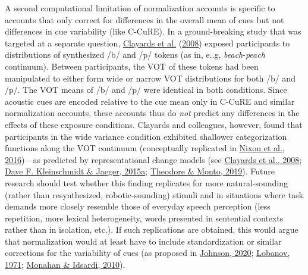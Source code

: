 \documentclass[
  11pt,
  english,
  man,floatsintext]{apa6}
\begin{document}
A second computational limitation of normalization accounts is specific to accounts that only correct for differences in the overall mean of cues but not differences in cue variability (like C-CuRE). In a ground-breaking study that was targeted at a separate question, \protect\hyperlink{ref-clayards2008}{Clayards et al.} (\protect\hyperlink{ref-clayards2008}{2008}) exposed participants to distributions of synthesized /b/ and /p/ tokens (as in, e..g, \emph{beach}-\emph{peach} continuum). Between participants, the VOT of these tokens had been manipulated to either form wide or narrow VOT distributions for both /b/ and /p/. The VOT means of /b/ and /p/ were identical in both conditions. Since acoustic cues are encoded relative to the cue mean only in C-CuRE and similar normalization accounts, these accounts thus do \emph{not} predict any differences in the effects of these exposure conditions. Clayards and colleagues, however, found that participants in the wide variance condition exhibited shallower categorization functions along the VOT continuum (conceptually replicated in \protect\hyperlink{ref-nixon2016}{Nixon et al., 2016})---as predicted by representational change models (see \protect\hyperlink{ref-clayards2008}{Clayards et al., 2008}; \protect\hyperlink{ref-kleinschmidt-jaeger2015}{Dave F. Kleinschmidt \& Jaeger, 2015a}; \protect\hyperlink{ref-theodore-monto2019}{Theodore \& Monto, 2019}). Future research should test whether this finding replicates for more natural-sounding (rather than resynthesized, robotic-sounding) stimuli and in situations where task demands more closely resemble those of everyday speech perception (less repetition, more lexical heterogeneity, words presented in sentential contexts rather than in isolation, etc.). If such replications are obtained, this would argue that normalization would at least have to include standardization or similar corrections for the variability of cues (as proposed in \protect\hyperlink{ref-johnson2020}{Johnson, 2020}; \protect\hyperlink{ref-lobanov1971}{Lobanov, 1971}; \protect\hyperlink{ref-monahan-idsardi2010}{Monahan \& Idsardi, 2010}).
\end{document}
